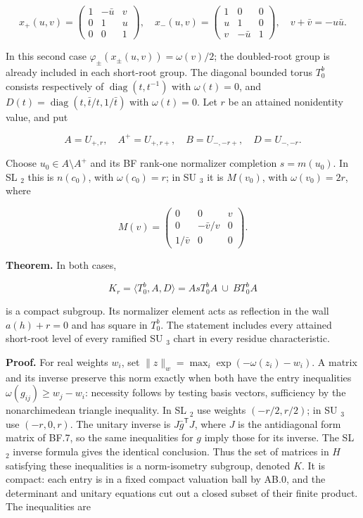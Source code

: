 \documentclass[
  11pt,
]{article}
\begin{document}
\[
 x_+(u,v)=\begin{pmatrix}1&-\bar u&v\\0&1&u\\0&0&1\end{pmatrix},\quad
 x_-(u,v)=\begin{pmatrix}1&0&0\\u&1&0\\v&-\bar u&1\end{pmatrix},\quad
 v+\bar v=-u\bar u.
 \tag{GB.1}
\]

In this second case \(\varphi_\pm(x_\pm(u,v))=\omega(v)/2\); the
doubled-root group is already included in each short-root group. The
diagonal bounded torus \(T_0^b\) consists respectively of
\(\operatorname{diag}(t,t^{-1})\) with \(\omega(t)=0\), and
\(D(t)=\operatorname{diag}(t,\bar t/t,1/\bar t)\) with \(\omega(t)=0\).
Let \(r\) be an attained nonidentity value, and put

\[
 A=U_{+,r},\quad A^+=U_{+,r+},\quad
 B=U_{-,-r+},\quad D=U_{-,-r}.
 \tag{GB.2}
\]

Choose \(u_0\in A\setminus A^+\) and its BF rank-one normalizer
completion \(s=m(u_0)\). In SL \(_2\) this is \(n(c_0)\), with
\(\omega(c_0)=r\); in SU \(_3\) it is \(M(v_0)\), with
\(\omega(v_0)=2r\), where

\[
 M(v)=\begin{pmatrix}0&0&v\\0&-\bar v/v&0\\1/\bar v&0&0\end{pmatrix}.
 \tag{GB.3}
\]

\textbf{Theorem.} In both cases,

\[
 K_r=\langle T_0^b,A,D\rangle
    =A sT_0^b A\ \cup\ B T_0^b A
 \tag{GB.4}
\]

is a compact subgroup. Its normalizer element acts as reflection in the
wall \(a(h)+r=0\) and has square in \(T_0^b\). The statement includes
every attained short-root level of every ramified SU \(_3\) chart in
every residue characteristic.

\textbf{Proof.} For real weights \(w_i\), set
\(\|z\|_w=\max_i\exp(-\omega(z_i)-w_i)\). A matrix and its inverse
preserve this norm exactly when both have the entry inequalities
\(\omega(g_{ij})\ge w_j-w_i\): necessity follows by testing basis
vectors, sufficiency by the nonarchimedean triangle inequality. In SL
\(_2\) use weights \((-r/2,r/2)\); in SU \(_3\) use \((-r,0,r)\). The
unitary inverse is \(J\bar g^{\mathsf T}J\), where \(J\) is the
antidiagonal form matrix of BF.7, so the same inequalities for \(g\)
imply those for its inverse. The SL \(_2\) inverse formula gives the
identical conclusion. Thus the set of matrices in \(H\) satisfying these
inequalities is a norm-isometry subgroup, denoted \(K\). It is compact:
each entry is in a fixed compact valuation ball by AB.0, and the
determinant and unitary equations cut out a closed subset of their
finite product. The inequalities are
\end{document}
